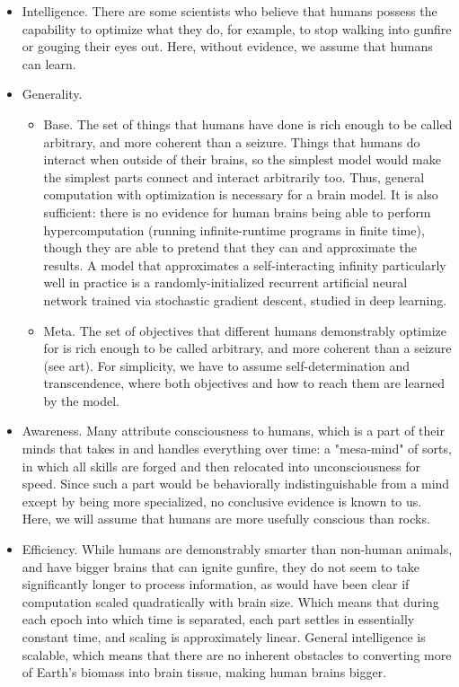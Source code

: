 \documentclass{article}
\begin{document}
\begin{itemize}
\item Intelligence. There are some scientists who believe that humans possess the capability to optimize what they do, for example, to stop walking into gunfire or gouging their eyes out. Here, without evidence, we assume that humans can learn.
\item Generality.
\begin{itemize}
\item Base. The set of things that humans have done is rich enough to be called arbitrary, and more coherent than a seizure. Things that humans do interact when outside of their brains, so the simplest model would make the simplest parts connect and interact arbitrarily too. Thus, general computation with optimization is necessary for a brain model. It is also sufficient: there is no evidence for human brains being able to perform hypercomputation (running infinite-runtime programs in finite time), though they are able to pretend that they can and approximate the results. A model that approximates a self-interacting infinity particularly well in practice is a randomly-initialized recurrent artificial neural network trained via stochastic gradient descent, studied in deep learning.
\item Meta. The set of objectives that different humans demonstrably optimize for is rich enough to be called arbitrary, and more coherent than a seizure (see art). For simplicity, we have to assume self-determination and transcendence, where both objectives and how to reach them are learned by the model.
\end{itemize}
\item Awareness. Many attribute consciousness to humans, which is a part of their minds that takes in and handles everything over time: a "mesa-mind" of sorts, in which all skills are forged and then relocated into unconsciousness for speed. Since such a part would be behaviorally indistinguishable from a mind except by being more specialized, no conclusive evidence is known to us. Here, we will assume that humans are more usefully conscious than rocks.
\item Efficiency. While humans are demonstrably smarter than non-human animals, and have bigger brains that can ignite gunfire, they do not seem to take significantly longer to process information, as would have been clear if computation scaled quadratically with brain size. Which means that during each epoch into which time is separated, each part settles in essentially constant time, and scaling is approximately linear. General intelligence is scalable, which means that there are no inherent obstacles to converting more of Earth's biomass into brain tissue, making human brains bigger.
\end{itemize}
\end{document}
